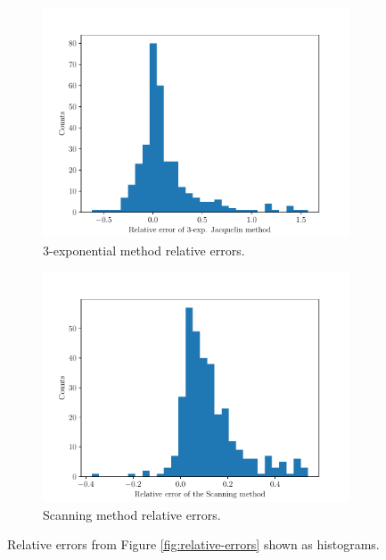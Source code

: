 \begin{figure}[ht]
	\centering
	\begin{subfigure}{0.49\textwidth}
		\centering
		\includegraphics[width=\textwidth]{figures/3exp-residuals}
		\caption{3-exponential method relative errors.}
		\label{fig:3exp-histogram}
	\end{subfigure}
	\hfill
	\begin{subfigure}{0.49\textwidth}
		\centering
		\includegraphics[width=\textwidth]{figures/scan-residuals}
		\caption{Scanning method relative errors.}
		\label{fig:scan-histogram}
	\end{subfigure}
	\caption{Relative errors from Figure \ref{fig:relative-errors} shown as histograms.}
	\label{fig:relative-errors-hists}
\end{figure}


